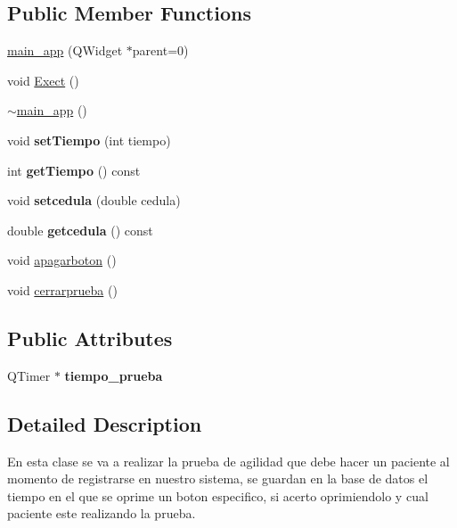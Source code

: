 \subsection*{Public Member Functions}
\begin{DoxyCompactItemize}
\item 
\hyperlink{classmain__app_a1d4b63e6e6a588b6d0baf8ad4cc646ce}{main\+\_\+app} (Q\+Widget $\ast$parent=0)
\item 
void \hyperlink{classmain__app_ab7becb80b6053dda9ca04f5ebe774ca0}{Exect} ()
\item 
\hyperlink{classmain__app_af8831d188195a6ac241250985377a7be}{$\sim$main\+\_\+app} ()
\item 
\mbox{\label{classmain__app_a1677762bb437a30601c0fa78ba9f043b}} 
void {\bfseries set\+Tiempo} (int tiempo)
\item 
\mbox{\label{classmain__app_a02deefad1525bbabce1fcc372a16e5fe}} 
int {\bfseries get\+Tiempo} () const
\item 
\mbox{\label{classmain__app_a730cd1902bea7fad2b28eda58c57d8f0}} 
void {\bfseries setcedula} (double cedula)
\item 
\mbox{\label{classmain__app_a852eb0ee681b8484ebc036c01f5d5b02}} 
double {\bfseries getcedula} () const
\item 
void \hyperlink{classmain__app_a981265dad144f9c9764c6f263f0dc461}{apagarboton} ()
\item 
void \hyperlink{classmain__app_a2b53dcbe6d60dc8fd978924037ce88cb}{cerrarprueba} ()
\end{DoxyCompactItemize}
\subsection*{Public Attributes}
\begin{DoxyCompactItemize}
\item 
\mbox{\label{classmain__app_a0b65200fbc076026b07434b395500268}} 
Q\+Timer $\ast$ {\bfseries tiempo\+\_\+prueba}
\end{DoxyCompactItemize}


\subsection{Detailed Description}
En esta clase se va a realizar la prueba de agilidad que debe hacer un paciente al momento de registrarse en nuestro sistema, se guardan en la base de datos el tiempo en el que se oprime un boton especifico, si acerto oprimiendolo y cual paciente este realizando la prueba. 

